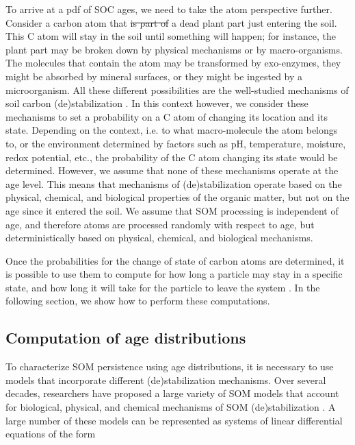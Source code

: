 \documentclass[draft,linenumbers]{agujournal}
\providecommand{\DIFadd}[1]{{\protect\color{blue}\uwave{#1}}} %
\providecommand{\DIFdel}[1]{{\protect\color{red}\sout{#1}}}                      %
\providecommand{\DIFaddbegin}{} %
\providecommand{\DIFaddend}{} %
\providecommand{\DIFdelbegin}{} %
\providecommand{\DIFdelend}{} %
\begin{document}
To arrive at a pdf of SOC ages, we need to take the atom perspective further. Consider a carbon atom that \DIFdelbegin \DIFdel{is part of }\DIFdelend \DIFaddbegin \DIFadd{belongs to }\DIFaddend a dead plant part just entering the soil. This C atom will stay in the soil until something will happen; for instance, the plant part may be broken down by physical mechanisms or by macro-organisms. The molecules that contain the atom may be transformed by exo-enzymes, they might be absorbed by mineral surfaces, or they might be ingested by a microorganism. All these different possibilities are the well-studied mechanisms of soil carbon (de)stabilization \citep{Sollins1996, vonLutzow2008, Schmidt2011, LehmannKleber}. In this context however, we consider these mechanisms to set a probability on a C atom of changing its location and its state. Depending on the context, i.e. to what macro-molecule the atom belongs to, or the environment determined by factors such as pH, temperature, moisture, redox potential, etc., the probability of the C atom changing its state would be determined. However, we assume that none of these mechanisms operate at the age level. This means that mechanisms of (de)stabilization operate based on the physical, chemical, and biological properties of the organic matter, but not on the age since it entered the soil. We assume that SOM processing is independent of age, and therefore atoms are processed randomly with respect to age, but deterministically based on physical, chemical, and biological mechanisms. 

Once the probabilities for the change of state of carbon atoms are determined, it is possible to use them to compute for how long a particle may stay in a specific state, and how long it will take for the particle to leave the system \citep{Metzler2018MG}. In the following section, we show how to perform these computations. 

\subsection{Computation of age distributions}
To characterize SOM persistence using age distributions, it is necessary to use models that incorporate different (de)stabilization mechanisms. Over several decades, researchers have proposed a large variety of SOM models that account for biological, physical, and chemical mechanisms of SOM (de)stabilization \citep{Manzoni2009SBB}. A large number of these models can be represented as systems of linear differential equations \citep{Sierra2015EM} of the form
\end{document}
